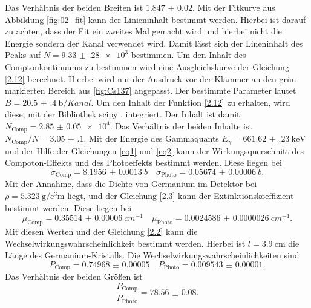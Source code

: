 Das Verhältnis der beiden Breiten ist $\num{1.847(20)}$. 
Mit der Fitkurve aus Abbildung \ref{fig:02_fit} kann der Linieninhalt bestimmt werden. Hierbei ist darauf zu achten, dass der Fit ein zweites Mal gemacht wird 
und hierbei nicht die Energie sondern der Kanal verwendet wird. Damit lässt sich der Lineninhalt des Peaks auf $N=\num{9.33(28)e3}$ bestimmen.
Um den Inhalt des Comptonkontinuums zu bestimmen wird eine Ausgleichskurve der Gleichung \ref{2.12} berechnet.
Hierbei wird nur der Ausdruck vor der Klammer an den grün markierten Bereich aus \ref{fig:Cs137} angepasst.
Der bestimmte Parameter lautet $B=\SI{20.5(4)}{\barn\per Kanal}$. Um den Inhalt der Funktion \ref{2.12} zu erhalten,
wird diese,  mit der Bibliothek scipy \cite{scipy}, integriert. Der Inhalt ist damit $N_{\text{Comp}} = \num{2.85(5)e4}$.
Das Verhältnis der beiden Inhalte ist $N_{\text{Comp}}/N=\num{3.05(10)}$.
Mit der Energie des Gammaquants $E_{\gamma}=\SI{661.62(23)}{\kilo\eV}$ und der Hilfe der Gleichungen \eqref{eq1} und 
\eqref{eq2} kann der Wirkungsquerschnitt des Compoton-Effekts und des Photoeffekts bestimmt werden.
Diese liegen bei 
\begin{equation*}
  \sigma_{\text{Comp}}=\SI{8.1956(13)}{b} \quad \sigma_{\text{Photo}}=\SI{0.05674(6)}{b}.
\end{equation*} 
Mit der Annahme, dass die Dichte von Germanium im Detektor bei $\rho = \SI{5.323}{\gram\per\cubic\centi\meter}$ \cite{Germanium_rho} liegt, und der
Gleichung \eqref{2.3} kann der Extinktionskoeffizient bestimmt werden.
Diese liegen bei 
\begin{equation*}
  \mu_{\text{Comp}} = \SI{0.35514(6)}{cm^{-1}} \quad \mu_{\text{Photo}} = \SI{0.0024586(26)}{cm^{-1}}.
\end{equation*}
Mit diesen Werten und der Gleichung \eqref{2.2} kann die Wechselwirkungswahrscheinlichkeit bestimmt werden.
Hierbei ist $l=\SI{3.9}{\centi\meter}$ die Länge des Germanium-Kristalls.
Die Wechselwirkungswahrscheinlichkeiten sind 
\begin{equation*}
  P_{\text{Comp}} = \num{0.74968(5)}\quad P_{\text{Photo}} = \num{0.009543(10)}.
\end{equation*}
Das Verhältnis der beiden Größen ist
\begin{equation*}
  \frac{P_{\text{Comp}} }{P_{\text{Photo}}} = \num{78.56(8)}.
\end{equation*}

